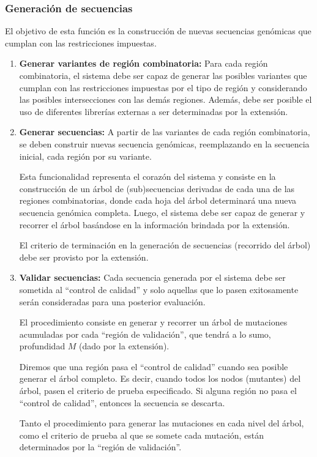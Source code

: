 \documentclass[10pt,a4paper]{article}
\begin{document}
  \subsubsection{Generaci\'on de secuencias}
  El objetivo de esta funci\'on es la construcci\'on de nuevas secuencias
gen\'omicas que cumplan con las restricciones impuestas.
  \begin{enumerate}
    \item \textbf{Generar variantes de regi\'on combinatoria:}
    Para cada regi\'on combinatoria, el sistema debe ser capaz de generar las
posibles variantes que cumplan con las restricciones impuestas por el tipo
de regi\'on y considerando las posibles intersecciones con las dem\'as regiones.
Adem\'as, debe ser posible el uso de diferentes librer\'ias externas a ser
determinadas por la extensi\'on.
    
    \item \textbf{Generar secuencias:}
    A partir de las variantes de cada regi\'on combinatoria, se deben construir
nuevas secuencia gen\'omicas, reemplazando en la secuencia inicial, cada
regi\'on por su variante.

    Esta funcionalidad representa el coraz\'on del sistema y consiste en la
construcci\'on de un \'arbol de (sub)secuencias derivadas de cada una de las
regiones combinatorias, donde cada hoja del \'arbol determinar\'a una nueva
secuencia gen\'omica completa. Luego, el sistema debe ser capaz de generar y
recorrer el \'arbol bas\'andose en la informaci\'on brindada por la extensi\'on.

    El criterio de terminaci\'on en la generaci\'on de secuencias (recorrido del
\'arbol) debe ser provisto por la extensi\'on.

    \item \textbf{Validar secuencias:}
    Cada secuencia generada por el sistema debe ser sometida al ``control de
calidad'' y solo aquellas que lo pasen exitosamente ser\'an consideradas para
una posterior evaluaci\'on.    

    El procedimiento consiste en generar y recorrer un \'arbol de mutaciones
acumuladas por cada ``regi\'on de validaci\'on'', que tendr\'a a lo sumo,
profundidad $M$ (dado por la extensi\'on). 

    Diremos que una regi\'on pasa el ``control de calidad'' cuando sea posible
generar el \'arbol completo. Es decir, cuando todos los nodos (mutantes) del
\'arbol, pasen el criterio de prueba especificado. Si alguna regi\'on no pasa el
``control de calidad'', entonces la secuencia se descarta.

    Tanto el procedimiento para generar las mutaciones en cada nivel del
\'arbol, como el criterio de prueba al que se somete cada mutaci\'on, est\'an
determinados por la ``regi\'on de validaci\'on''.
  \end{enumerate}
\end{document}
